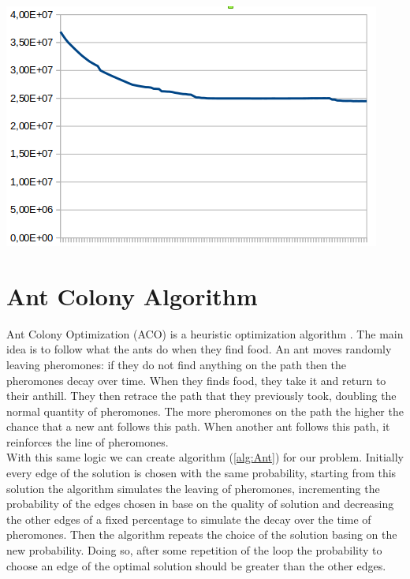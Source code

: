 \begin{center}
	\includegraphics[scale=0.5]{Graphics/graph.png}
	\label{img:wfcp}
\end{center}

\newpage
\section{Ant Colony Algorithm}
Ant Colony Optimization (ACO) is a heuristic optimization algorithm . The main idea is to follow what the ants do when they find food. An ant moves randomly leaving pheromones: if they do not find anything on the path then the pheromones decay over time. When they finds food, they take it and return to their anthill. They then retrace the path that they previously took, doubling the normal quantity of pheromones. The more pheromones on the path the higher the chance that a new ant follows this path. When another ant follows this path, it reinforces the line of pheromones.\\
With this same logic we can create algorithm (\ref{alg:Ant}) for our problem. Initially every edge of the solution is chosen with the same probability, starting from this solution the algorithm simulates the leaving of pheromones, incrementing the probability of the edges chosen in base on the quality of solution and decreasing the other edges of a fixed percentage to simulate the decay over the time of pheromones. Then the algorithm repeats the choice of the solution basing on the new probability. Doing so, after some repetition of the loop the probability to choose an edge of the optimal solution should be greater than the other edges.\\


